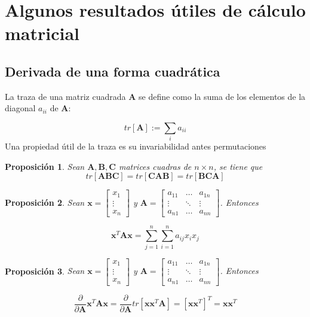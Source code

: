 \documentclass[12pt, twoside]{book}\usepackage[]{graphicx}\usepackage[]{color}
\numberwithin{equation}{section}
\numberwithin{theorem}{section}
\newtheorem{teorema}{Proposición}
\numberwithin{teorema}{section}
\numberwithin{defi}{section}
\numberwithin{prop}{section}
\numberwithin{defi}{section}
\theoremstyle{plain}
\begin{document}
\section{Algunos resultados útiles de cálculo matricial}

\subsection{Derivada de una forma cuadrática}
La traza de una matriz cuadrada $\mathbf{A}$ se define como la suma de los elementos de la diagonal $a_{ii}$ de $\mathbf{A}$: 

\begin{equation}
tr[\mathbf{A}]:= \sum_{i}a_{ii}
\end{equation}
Una propiedad útil de la traza es su invariabilidad antes permutaciones

\begin{teorema}
Sean $\mathbf{A,B,C}$ matrices cuadras de $n\times n$, se tiene que
\begin{equation}
tr[\mathbf{ABC}] = tr[\mathbf{CAB}] = tr[\mathbf{BCA}]
\end{equation}
\end{teorema}

\begin{teorema}
Sean $\mathbf{x} = \left[\begin{array}{c} x_{1} \\ \vdots \\ x_{n} \end{array}\right]$ y $\mathbf{A} =
\left[\begin{array}{ccc}
a_{11} & \hdots & a_{1n} \\ 
\vdots & \ddots & \vdots \\ 
a_{n1} & \hdots & a_{nn}
\end{array}\right]$. Entonces

\begin{equation}
\mathbf{x}^{T}\mathbf{Ax} = \sum_{j=1}^{n}\sum_{i=1}^{n}a_{ij}x_{i}x_{j}
\end{equation}
\end{teorema}

\begin{teorema}
Sean $\mathbf{x} = \left[\begin{array}{c} x_{1} \\ \vdots \\ x_{n} \end{array}\right]$ y $\mathbf{A} =
\left[\begin{array}{ccc}
a_{11} & \hdots & a_{1n} \\ 
\vdots & \ddots & \vdots \\ 
a_{n1} & \hdots & a_{nn}
\end{array}\right]$. Entonces

\begin{equation}
\frac{\partial}{\partial \mathbf{A}}\mathbf{x}^{T}\mathbf{Ax} = 
\frac{\partial}{\partial \mathbf{A}}tr\left[\mathbf{xx}^{T}\mathbf{A}\right] = \left[\mathbf{xx}^{T}\right]^{T} = \mathbf{xx}^{T}
\end{equation}

\end{teorema}
\end{document}
